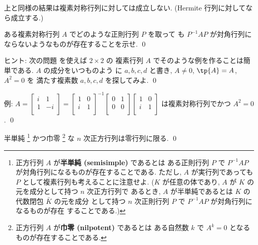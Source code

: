 \documentclass[12pt,twoside]{jarticle}
\newcommand\commentout[1]{#1}
\newcommand\commentout[1]{}
\begin{document}
\bigskip

上と同様の結果は複素対称行列に対しては成立しない. 
(Hermite 行列に対してなら成立する.)

\begin{question}
\label{q:non-semisimple}
  ある複素対称行列 $A$ でどのような正則行列 $P$ を取って
  も $P^{-1}AP$ が対角行列にならないようなものが存在することを示せ. \qed
\end{question}

\noindent
ヒント: 次の問題  を使えば $2\times 2$ の
複素行列 $A$ でそのような例を作ることは簡単である.  $A$ の成分をいつものよう
に $a,b,c,d$ と書き, $A\ne 0$, $\tp{A}=A$, $A^2=0$ を
満たす複素数 $a,b,c,d$ を探してみよ.
\qed

\commentout{
\medskip
\noindent
例: $A=
\begin{bmatrix}
  i & 1 \\
  1 & -i \\
\end{bmatrix}=
\begin{bmatrix}
  1 & 0 \\
  i & 1 \\
\end{bmatrix}^{-1}
\begin{bmatrix}
  0 & 1 \\
  0 & 0 \\
\end{bmatrix}
\begin{bmatrix}
  1 & 0 \\
  i & 1 \\
\end{bmatrix}$ は複素対称行列でかつ $A^2=0$.
\qed
}


\begin{question}
\label{q:ss-cap-nip=0}
  半単純%
  \footnote{正方行列 $A$ が{\bf 半単純 (semisimple)} であるとは
    ある正則行列 $P$ で $P^{-1}AP$ が対角行列になるものが存在することである.
    ただし, $A$ が実行列であっても $P$ として複素行列も考えることに注意せよ.
    ($K$ が任意の体であり, $A$ が $K$ の元を成分として持つ $n$ 次正方行列で
    あるとき, $A$ が半単純であるとは $K$ の代数閉包 $\bar{K}$ の元を成分
    として持つ $n$ 次正則行列 $P$ で $P^{-1}AP$ が対角行列になるものが存在
    することである.) 
    }%
  かつ巾零%
  \footnote{正方行列 $A$ が{\bf 巾零 (nilpotent)} であるとは
    ある自然数 $k$ で $A^k=0$ となるものが存在することである.}%
  な $n$ 次正方行列は零行列に限る.  \qed
\end{question}
\end{document}
